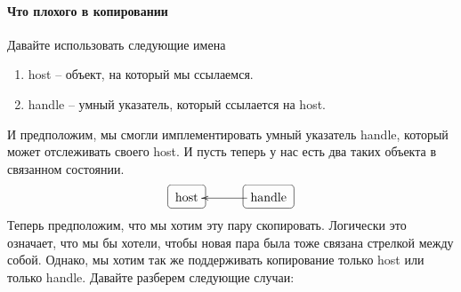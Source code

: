 \paragraph{Что плохого в копировании}

Давайте использовать следующие имена
\begin{enumerate}
\item host -- объект, на который мы ссылаемся.

\item handle -- умный указатель, который ссылается на host.
\end{enumerate}
И предположим, мы смогли имплементировать умный указатель handle, который может отслеживать своего host.
И пусть теперь у нас есть два таких объекта в связанном состоянии.
\[
\xymatrix@R=15pt@C=15pt{
  {\text{host}}
      	{
	\save
   [].[]*+[F-:<3pt>]\frm{}
   \restore
	}
  &{}&{\text{handle}}\ar[ll]
    	{
	\save
   [].[]*+[F-:<3pt>]\frm{}
   \restore
	}
  \\ 
}
\]
Теперь предположим, что мы хотим эту пару скопировать.
Логически это означает, что мы бы хотели, чтобы новая пара была тоже связана стрелкой между собой.
Однако, мы хотим так же поддерживать копирование только host или только handle.
Давайте разберем следующие случаи:

